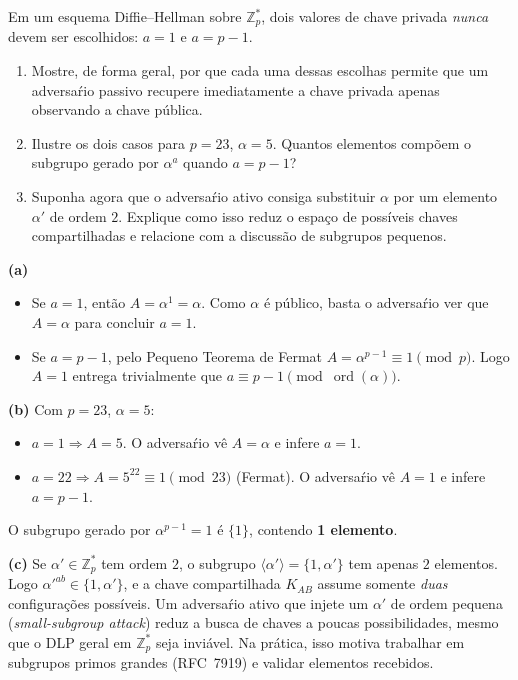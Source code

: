 \documentclass[12pt,a4paper]{article}
\begin{document}
\begin{exercicio}
Em um esquema Diffie--Hellman sobre $\mathbb{Z}_{p}^{*}$, dois valores de chave privada \emph{nunca} devem ser escolhidos: $a = 1$ e $a = p-1$.
\begin{enumerate}[label=(\alph*)]
    \item Mostre, de forma geral, por que cada uma dessas escolhas permite que um adversa\'{r}io passivo recupere imediatamente a chave privada apenas observando a chave p\'{u}blica.
    \item Ilustre os dois casos para $p = 23$, $\alpha = 5$. Quantos elementos comp\~{o}em o subgrupo gerado por $\alpha^{a}$ quando $a = p-1$?
    \item Suponha agora que o adversa\'{r}io ativo consiga substituir $\alpha$ por um elemento $\alpha'$ de ordem $2$. Explique como isso reduz o espa\c{c}o de poss\'{i}veis chaves compartilhadas e relacione com a discuss\~{a}o de subgrupos pequenos.
\end{enumerate}

\begin{resposta}
\textbf{(a)}
\begin{itemize}[leftmargin=1.4em,topsep=2pt,itemsep=1pt]
    \item Se $a = 1$, ent\~{a}o $A = \alpha^{1} = \alpha$. Como $\alpha$ \'{e} p\'{u}blico, basta o adversa\'{r}io ver que $A = \alpha$ para concluir $a = 1$.
    \item Se $a = p-1$, pelo Pequeno Teorema de Fermat $A = \alpha^{p-1} \equiv 1 \pmod{p}$. Logo $A = 1$ entrega trivialmente que $a \equiv p-1 \pmod{\operatorname{ord}(\alpha)}$.
\end{itemize}

\textbf{(b)} Com $p = 23$, $\alpha = 5$:
\begin{itemize}[leftmargin=1.4em,topsep=2pt,itemsep=1pt]
    \item $a = 1 \Rightarrow A = 5$. O adversa\'{r}io v\^{e} $A = \alpha$ e infere $a = 1$.
    \item $a = 22 \Rightarrow A = 5^{22} \equiv 1 \pmod{23}$ (Fermat). O adversa\'{r}io v\^{e} $A = 1$ e infere $a = p-1$.
\end{itemize}
O subgrupo gerado por $\alpha^{p-1} = 1$ \'{e} $\{1\}$, contendo \textbf{1 elemento}.

\textbf{(c)} Se $\alpha' \in \mathbb{Z}_p^{*}$ tem ordem $2$, o subgrupo $\langle \alpha' \rangle = \{1, \alpha'\}$ tem apenas $2$ elementos. Logo $\alpha'^{ab} \in \{1, \alpha'\}$, e a chave compartilhada $K_{AB}$ assume somente \emph{duas} configura\c{c}\~{o}es poss\'{i}veis. Um adversa\'{r}io ativo que injete um $\alpha'$ de ordem pequena (\emph{small-subgroup attack}) reduz a busca de chaves a poucas possibilidades, mesmo que o DLP geral em $\mathbb{Z}_p^{*}$ seja invi\'{a}vel. Na pr\'{a}tica, isso motiva trabalhar em subgrupos primos grandes (RFC~7919) e validar elementos recebidos.
\end{resposta}
\end{exercicio}
\end{document}
